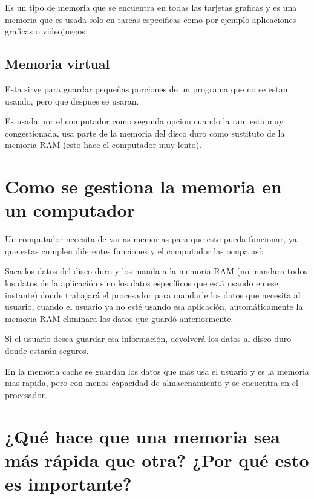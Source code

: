 \documentclass{article}
\begin{document}
Es un tipo de memoria que se encuentra en todas las tarjetas graficas y es una memoria que es usada solo en tareas especificas como por ejemplo aplicaciones graficas o videojuegos

\subsection{Memoria virtual}
Esta sirve para guardar pequeñas porciones de un programa que no se estan usando, pero que despues se usaran.
\vspace{0.5cm}

Es usada por el computador como segunda opcion cuando la ram esta muy congestionada, usa parte de la memoria del disco duro como sustituto de la memoria RAM (esto hace el computador muy lento).

\section{Como se gestiona la memoria en un computador} \label{Como se gestiona la memoria en un computador}

Un computador necesita de varias memorias para que este pueda funcionar, ya que estas cumplen diferentes funciones y el computador las ocupa así:
\vspace{0.5cm}

Saca los datos del disco duro y los manda a la memoria RAM (no mandara todos los datos de la aplicación sino los datos específicos que está usando en ese instante) donde trabajará el procesador para mandarle los datos que necesita al usuario, cuando el usuario ya no esté usando esa aplicación, automáticamente la memoria RAM eliminara los datos que guardó anteriormente.
\vspace{0.5cm}

Si el usuario desea guardar esa información, devolverá los datos al disco duro donde estarán seguros.
\vspace{0.5cm}

En la memoria cache se guardan los datos que mas usa el usuario y es la memoria mas rapida, pero con menos capacidad de almacenamiento y se encuentra en el procesador.


\section{¿Qué hace que una memoria sea más rápida que otra? ¿Por qué esto es importante?} \label{¿Qué hace que una memoria sea más rápida que otra? ¿Por qué esto es importante?}
\end{document}
